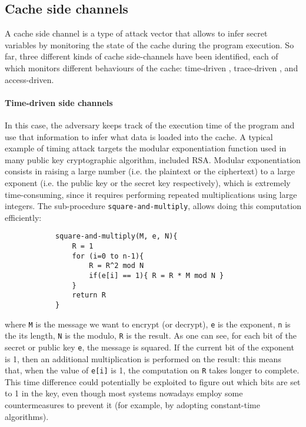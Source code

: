 \documentclass[target=mst,aauheader=aics]{thud}
\theoremstyle{definition}
\begin{document}
	\subsection{Cache side channels}\label{sec:cache-sc}
	A cache side channel \cite{Zhang2017} is a type of attack vector that allows to infer secret variables by monitoring the state of the cache during the program execution. So far, three different kinds of cache side-channels have been identified, each of which monitors different behaviours of the cache: time-driven \cite{Page2002}, trace-driven \cite{Page2002}, and access-driven.
	\paragraph{Time-driven side channels} In this case, the adversary keeps track of the execution time of the program and use that information to infer what data is loaded into the cache. 
	A typical example of timing attack targets the modular exponentiation function used in many public key cryptographic algorithm, included RSA. Modular exponentiation consists in raising a large number (i.e. the plaintext or the ciphertext) to a large exponent (i.e. the public key or the secret key respectively), which is extremely time-consuming, since it requires performing repeated multiplications using large integers. The sub-procedure \texttt{square-and-multiply}, allows doing this computation efficiently:
	
	\vspace{3mm}
	\begin{minipage}{.6\textwidth}
		\begin{lstlisting}
			square-and-multiply(M, e, N){
				R = 1
				for (i=0 to n-1){
					R = R^2 mod N
					if(e[i] == 1){ R = R * M mod N }
				}	
				return R
			}
		\end{lstlisting}
	\end{minipage}
	
	where \texttt{M} is the message we want to encrypt (or decrypt), \texttt{e} is the exponent, \texttt{n} is the its length, \texttt{N} is the modulo, \texttt{R} is the result. As one can see, for each bit of the secret or public key \texttt{e}, the message is squared. If the current bit of the exponent is 1, then an additional multiplication is performed on the result: this means that, when the value of \texttt{e[i]} is 1, the computation on \texttt{R} takes longer to complete. This time difference could potentially be exploited to figure out which bits are set to 1 in the key, even though most systems nowadays employ some countermeasures to prevent it (for example, by adopting constant-time algorithms).
\end{document}

